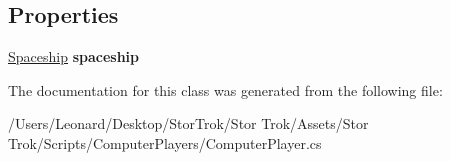 \subsection*{Properties}
\begin{DoxyCompactItemize}
\item 
\mbox{\label{class_computer_player_a7e4609385eec3f637f8e7bbcd328a9a3}} 
\hyperlink{class_spaceship}{Spaceship} {\bfseries spaceship}
\end{DoxyCompactItemize}


The documentation for this class was generated from the following file\+:\begin{DoxyCompactItemize}
\item 
/\+Users/\+Leonard/\+Desktop/\+Stor\+Trok/\+Stor Trok/\+Assets/\+Stor Trok/\+Scripts/\+Computer\+Players/Computer\+Player.\+cs\end{DoxyCompactItemize}
